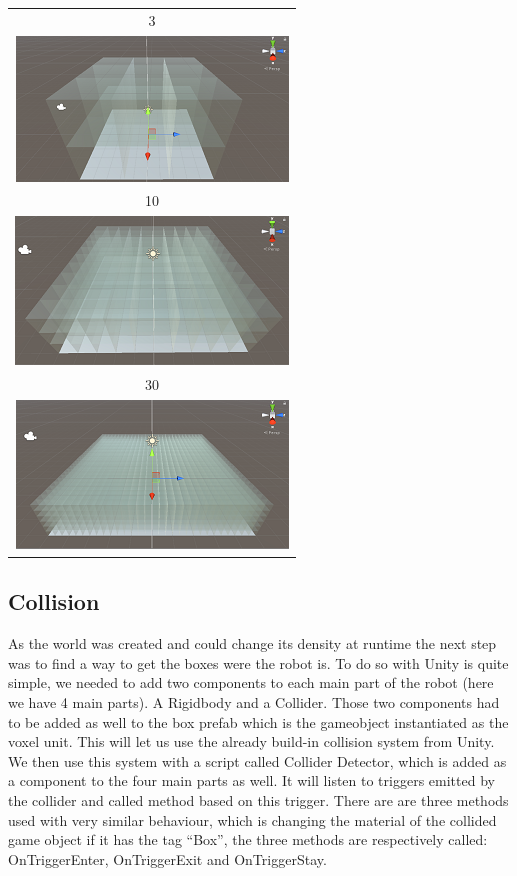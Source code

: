 \documentclass{scrartcl}
\begin{document}
\begin{center}
  \begin{tabular}{c}
    3 \\
    \includegraphics{voxel_world_3}  \\
    10 \\
    \includegraphics{voxel_world_10} \\
    30 \\
    \includegraphics{voxel_world_30}
  \end{tabular}
\end{center}

\subsection{Collision}

As the world was created and could change its density at runtime the next step was to find a way to get the boxes were the robot is. 
To do so with Unity is quite simple, we needed to add two components to each main part of the robot (here we have 4 main parts). 
A Rigidbody and a Collider. Those two components had to be added as well to the box prefab which is the gameobject instantiated as the voxel unit. 
This will let us use the already build-in collision system from Unity. We then use this system with a script called Collider Detector, 
which is added as a component to the four main parts as well. It will listen to triggers emitted by the collider and called method based on this trigger. 
There are are three methods used with very similar behaviour, which is changing the material of the collided game object if it has the tag “Box”, 
the three methods are respectively called: OnTriggerEnter, OnTriggerExit and OnTriggerStay. 
\end{document}
